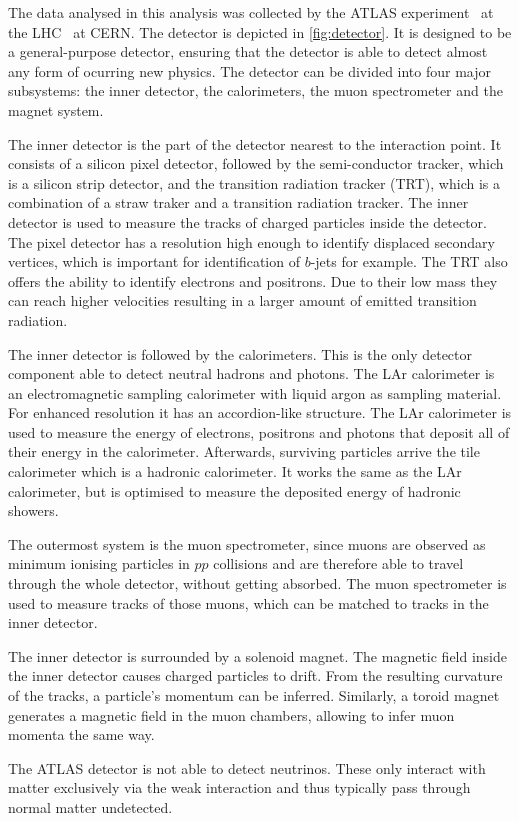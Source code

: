 The data analysed in this analysis was collected by the ATLAS experiment~\cite{ATLAS} at the LHC~\cite{LHC} at CERN. The detector is depicted in \autoref{fig:detector}. It is designed to be a general-purpose detector, ensuring that the detector is able to detect almost any form of ocurring new physics. The detector can be divided into four major subsystems: the inner detector, the calorimeters, the muon spectrometer and the magnet system.

The inner detector is the part of the detector nearest to the interaction point. It consists of a silicon pixel detector, followed by the semi-conductor tracker, which is a silicon strip detector, and the transition radiation tracker (TRT), which is a combination of a straw traker and a transition radiation tracker. The inner detector is used to measure the tracks of charged particles inside the detector. The pixel detector has a resolution high enough to identify displaced secondary vertices, which is important for identification of $b$-jets for example. The TRT also offers the ability to identify electrons and positrons. Due to their low mass they can reach higher velocities resulting in a larger amount of emitted transition radiation.

The inner detector is followed by the calorimeters. This is the only detector component able to detect neutral hadrons and photons.
The LAr calorimeter is an electromagnetic sampling calorimeter with liquid argon as sampling material. For enhanced resolution it has an accordion-like structure. The LAr calorimeter is used to measure the energy of electrons, positrons and photons that deposit all of their energy in the calorimeter.
Afterwards, surviving particles arrive the tile calorimeter which is a hadronic calorimeter. It works the same as the LAr calorimeter, but is optimised to measure the deposited energy of hadronic showers.

The outermost system is the muon spectrometer, since muons are observed as minimum ionising particles in $pp$ collisions and are therefore able to travel through the whole detector, without getting absorbed. The muon spectrometer is used to measure tracks of those muons, which can be matched to tracks in the inner detector.

The inner detector is surrounded by a solenoid magnet. The magnetic field inside the inner detector causes charged particles to drift. From the resulting curvature of the tracks, a particle's momentum can be inferred.
Similarly, a toroid magnet generates a magnetic field in the muon chambers, allowing to infer muon momenta the same way.

The ATLAS detector is not able to detect neutrinos. These only interact with matter exclusively via the weak interaction and thus typically pass through normal matter undetected.

